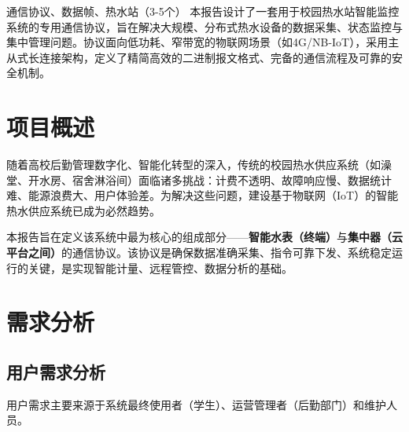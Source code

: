 \documentclass{wlwtxjsccp}
\begin{document}
\makecover
\tableofcontents

\begin{reportabstract}{通信协议、数据帧、热水站（3-5个）}
本报告设计了一套用于校园热水站智能监控系统的专用通信协议，旨在解决大规模、分布式热水设备的数据采集、状态监控与集中管理问题。协议面向低功耗、窄带宽的物联网场景（如4G/NB-IoT），采用主从式长连接架构，定义了精简高效的二进制报文格式、完备的通信流程及可靠的安全机制。
\end{reportabstract}

\cqutBeginReportBody

\section{项目概述}
随着高校后勤管理数字化、智能化转型的深入，传统的校园热水供应系统（如澡堂、开水房、宿舍淋浴间）面临诸多挑战：计费不透明、故障响应慢、数据统计难、能源浪费大、用户体验差。为解决这些问题，建设基于物联网（IoT）的智能热水供应系统已成为必然趋势。

本报告旨在定义该系统中最为核心的组成部分——\textbf{智能水表（终端）}与\textbf{集中器（云平台之间）}的通信协议。该协议是确保数据准确采集、指令可靠下发、系统稳定运行的关键，是实现智能计量、远程管控、数据分析的基础。

\section{需求分析}
\subsection{用户需求分析}
用户需求主要来源于系统最终使用者（学生）、运营管理者（后勤部门）和维护人员。


\end{document}
